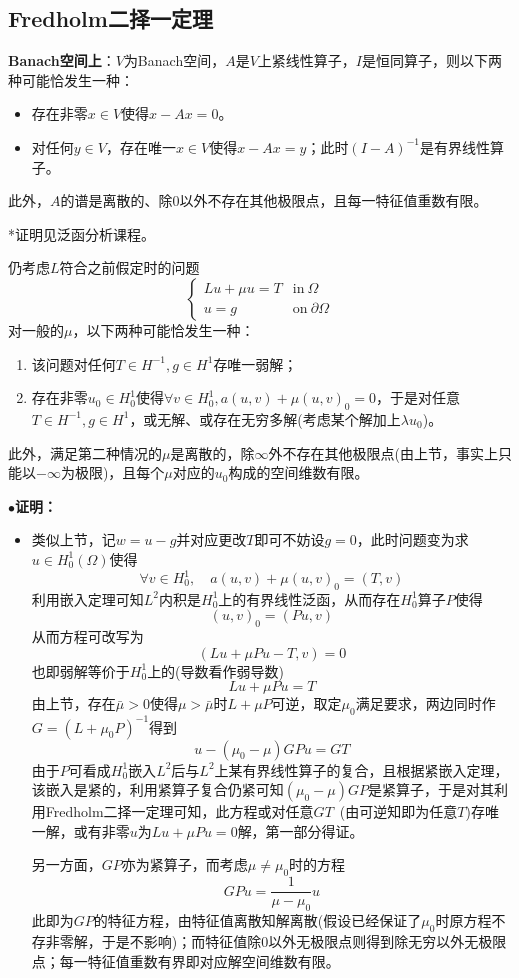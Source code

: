 \documentclass[a4paper,UTF8,fontset=windows,AutoFakeBold]{ctexart}
\newcommand{\proo}[1]{{\kaishu $\bullet$\textbf{证明：}
\begin{itemize}
    \item[] #1
\end{itemize}
}}
\begin{document}
\subsection{Fredholm二择一定理}
\textbf{Banach空间上}：$V$为Banach空间，$A$是$V$上紧线性算子，$I$是恒同算子，则以下两种可能恰发生一种：
\begin{itemize}
    \item 存在非零$x\in V$使得$x-Ax=0$。
    \item 对任何$y\in V$，存在唯一$x\in V$使得$x-Ax=y$；此时$(I-A)^{-1}$是有界线性算子。
\end{itemize}

此外，$A$的谱是离散的、除0以外不存在其他极限点，且每一特征值重数有限。

*证明见泛函分析课程。

仍考虑$L$符合之前假定时的问题
$$\begin{cases}Lu+\mu u=T&\text{in}\ \Omega\\u=g&\text{on}\ \partial\Omega\end{cases}$$
对一般的$\mu$，以下两种可能恰发生一种：
\begin{enumerate}
    \item 该问题对任何$T\in H^{-1},g\in H^1$存唯一弱解；
    \item 存在非零$u_0\in H_0^1$使得$\forall v\in H_0^1,a(u,v)+\mu(u,v)_0=0$，于是对任意$T\in H^{-1},g\in H^1$，或无解、或存在无穷多解(考虑某个解加上$\lambda u_0$)。
\end{enumerate}

此外，满足第二种情况的$\mu$是离散的，除$\infty$外不存在其他极限点(由上节，事实上只能以$-\infty$为极限)，且每个$\mu$对应的$u_0$构成的空间维数有限。

\proo{
    类似上节，记$w=u-g$并对应更改$T$即可不妨设$g=0$，此时问题变为求$u\in H_0^1(\Omega)$使得
    $$\forall v\in H_0^1,\quad a(u,v)+\mu(u,v)_0=(T,v)$$
    利用嵌入定理可知$L^2$内积是$H_0^1$上的有界线性泛函，从而存在$H_0^1$算子$P$使得
    $$(u,v)_0=(Pu,v)$$
    从而方程可改写为
    $$(Lu+\mu Pu-T,v)=0$$
    也即弱解等价于$H_0^1$上的(导数看作弱导数)
    $$Lu+\mu Pu=T$$
    由上节，存在$\bar\mu>0$使得$\mu>\bar\mu$时$L+\mu P$可逆，取定$\mu_0$满足要求，两边同时作$G=(L+\mu_0P)^{-1}$得到
    $$u-(\mu_0-\mu)GPu=GT$$
    由于$P$可看成$H_0^1$嵌入$L^2$后与$L^2$上某有界线性算子的复合，且根据紧嵌入定理，该嵌入是紧的，利用紧算子复合仍紧可知$(\mu_0-\mu)GP$是紧算子，于是对其利用Fredholm二择一定理可知，此方程或对任意$GT$\ (由可逆知即为任意$T$)存唯一解，或有非零$u$为$Lu+\mu Pu=0$解，第一部分得证。

    另一方面，$GP$亦为紧算子，而考虑$\mu\ne\mu_0$时的方程
    $$GPu=\frac{1}{\mu-\mu_0}u$$
    此即为$GP$的特征方程，由特征值离散知解离散(假设已经保证了$\mu_0$时原方程不存非零解，于是不影响)；而特征值除0以外无极限点则得到除无穷以外无极限点；每一特征值重数有界即对应解空间维数有限。
}
\end{document}
